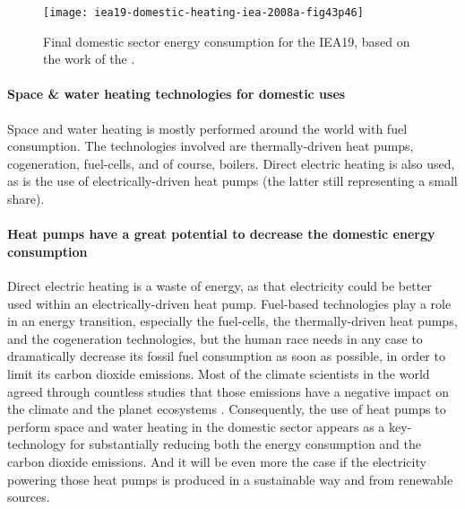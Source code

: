 \begin{figure}[htbp]
  \centering
  \texttt{[image: iea19-domestic-heating-iea-2008a-fig43p46]}
  \caption[Final household energy consumption for the IEA19]
  {Final domestic sector energy consumption for the IEA19, based on
    the work of the \citet[Fig.\,4.3, p.\,46]{iea-2008a}.}
  \label{fig:household-energy-consumption-2005}
\end{figure}

\paragraph{Space \& water heating technologies for domestic uses}
Space and water heating is mostly performed around the world with fuel
consumption. The technologies involved are thermally-driven heat
pumps, cogeneration,
fuel-cells, and of course, boilers. Direct electric heating is also
used, as is the use of electrically-driven heat pumps (the latter still representing a
small share).

\paragraph{Heat pumps have a great potential to decrease the domestic
  energy consumption} Direct electric heating is a waste of energy, as
that electricity could be better used within an electrically-driven
heat pump. Fuel-based
technologies play a role in an energy transition, especially the
fuel-cells, the thermally-driven heat pumps, and the cogeneration
technologies, but the human race needs in any case to dramatically
decrease its fossil fuel consumption as soon as possible, in order to limit its carbon
dioxide emissions. Most of the climate
scientists in the world agreed through countless studies that those
emissions have a negative impact on the climate and the planet
ecosystems \citep{IPCC-2014a}. Consequently, the
use of heat pumps to perform space and water heating
in the domestic sector appears as a key-technology for substantially
reducing both the energy consumption and the carbon dioxide
emissions. And it will be even more the case if the electricity
powering those heat pumps is produced in a sustainable way and from
renewable sources.



